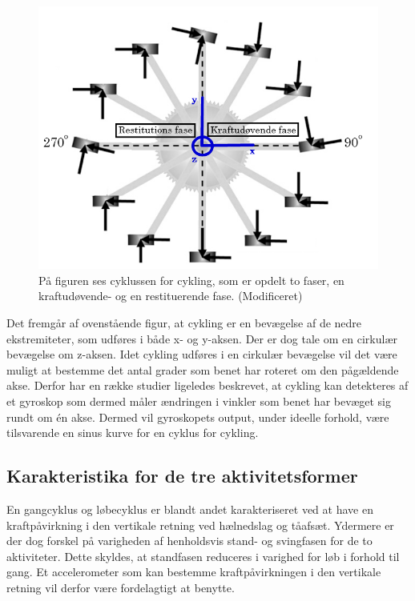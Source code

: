 \begin{figure}[H]
	\centering
	\includegraphics[scale=0.5]{figures/bProblemloesning/cykel_cyklus.png}
	\caption{På figuren ses cyklussen for cykling, som er opdelt to faser, en kraftudøvende- og en restituerende fase. \citep{Springer2014} (Modificeret)}
	\label{fig:cykel_cyklus}
\end{figure}

Det fremgår af ovenstående figur, at cykling er en bevægelse af de nedre ekstremiteter, som udføres i både x- og y-aksen. Der er dog tale om en cirkulær bevægelse om z-aksen. \newline
Idet cykling udføres i en cirkulær bevægelse vil det være muligt at bestemme det antal grader som benet har roteret om den pågældende akse. Derfor har en række studier ligeledes beskrevet, at cykling kan detekteres af et gyroskop som dermed måler ændringen i vinkler som benet har bevæget sig rundt om én akse. Dermed vil gyroskopets output, under ideelle forhold, være tilsvarende en sinus kurve for en cyklus for cykling. \citep{Cockcroft2011,Marin-PerianuMarin-Perianu2013}


\subsection{Karakteristika for de tre aktivitetsformer}
En gangcyklus og løbecyklus er blandt andet karakteriseret ved at have en kraftpåvirkning i den vertikale retning ved hælnedslag og tåafsæt. Ydermere er der dog forskel på varigheden af henholdsvis stand- og svingfasen for de to aktiviteter. Dette skyldes, at standfasen reduceres i varighed for løb i forhold til gang. \newline
Et accelerometer som kan bestemme kraftpåvirkningen i den vertikale retning vil derfor være fordelagtigt at benytte. \citep{Lee1998,Rueterbories2010}

